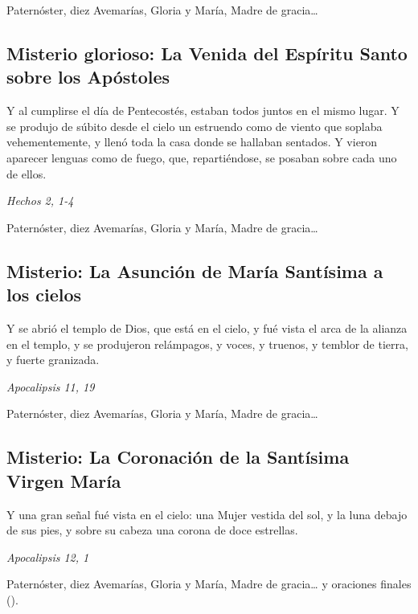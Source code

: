 \documentclass[./rosary.tex]{subfiles}
\newcounter{glorious-counter}
\begin{document}
Paternóster, diez Avemarías, Gloria y María, Madre de gracia{\ldots}

\bigskip

\subsection*{ Misterio glorioso: La Venida del Espíritu Santo sobre los Apóstoles}

Y al cumplirse el día de Pentecostés, estaban todos juntos en el mismo lugar. Y se produjo de súbito desde el cielo un estruendo como de viento que soplaba vehementemente,
y llenó toda la casa donde se hallaban sentados. Y vieron aparecer lenguas como de fuego, que, repartiéndose, se posaban sobre cada uno de ellos.

\begin{flushright}
      \emph{Hechos 2, 1-4}
\end{flushright}

Paternóster, diez Avemarías, Gloria y María, Madre de gracia{\ldots}

\bigskip

\subsection*{ Misterio: La Asunción de María Santísima a los cielos}

Y se abrió el templo de Dios, que está en el cielo, y fué vista el arca de la alianza en el templo,
y se produjeron relámpagos, y voces, y truenos, y temblor de tierra, y fuerte granizada.

\begin{flushright}
      \emph{Apocalipsis 11, 19}
\end{flushright}

Paternóster, diez Avemarías, Gloria y María, Madre de gracia{\ldots}

\bigskip

\subsection*{ Misterio: La Coronación de la Santísima Virgen María}

Y una gran señal fué vista en el cielo: una Mujer vestida del sol, y la luna debajo de sus pies, y sobre su cabeza una corona de doce estrellas.

\begin{flushright}
      \emph{Apocalipsis 12, 1}
\end{flushright}

Paternóster, diez Avemarías, Gloria y María, Madre de gracia{\ldots} y oraciones finales ().
\end{document}
